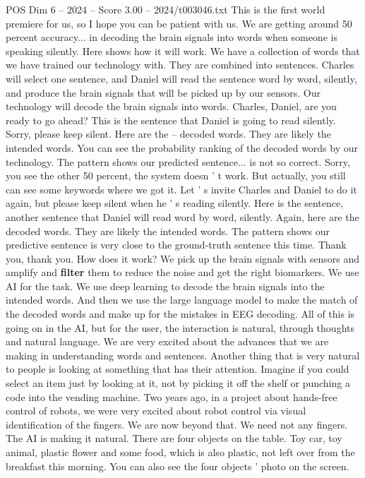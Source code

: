 \begin{textsample}{POS Dim 6 – 2024 – Score 3.00 – 2024/t003046.txt}
This is the first world premiere for us, so I hope you can be patient with us.
We are getting around 50 percent accuracy... in decoding the brain signals into words when someone is speaking silently.
Here shows how it will work.
We have a collection of words that we have trained our technology with.
They are combined into sentences.
Charles will select one sentence, and Daniel will read the sentence word by word, silently, and produce the brain signals that will be picked up by our sensors.
Our technology will decode the brain signals into words.
Charles, Daniel, are you ready to go ahead?
This is the sentence that Daniel is going to read silently.
Sorry, please keep silent.
Here are the -- decoded words.
They are likely the intended words.
You can see the probability ranking of the decoded words by our technology.
The pattern shows our predicted sentence... is not so correct.
Sorry, you see the other 50 percent, the system doesn ' t work.
But actually, you still can see some keywords where we got it.
Let ' s invite Charles and Daniel to do it again, but please keep silent when he ' s reading silently.
Here is the sentence, another sentence that Daniel will read word by word, silently.
Again, here are the decoded words.
They are likely the intended words.
The pattern shows our predictive sentence is very close to the ground-truth sentence this time.
Thank you, thank you.
How does it work?
We pick up the brain signals with sensors and amplify and \textbf{filter} them to reduce the noise and get the right biomarkers.
We use AI for the task.
We use deep learning to decode the brain signals into the intended words.
And then we use the large language model to make the match of the decoded words and make up for the mistakes in EEG decoding.
All of this is going on in the AI, but for the user, the interaction is natural, through thoughts and natural language.
We are very excited about the advances that we are making in understanding words and sentences.
Another thing that is very natural to people is looking at something that has their attention.
Imagine if you could select an item just by looking at it, not by picking it off the shelf or punching a code into the vending machine.
Two years ago, in a project about hands-free control of robots, we were very excited about robot control via visual identification of the fingers.
We are now beyond that.
We need not any fingers.
The AI is making it natural.
There are four objects on the table.
Toy car, toy animal, plastic flower and some food, which is also plastic, not left over from the breakfast this morning.
You can also see the four objects ' photo on the screen.

\end{textsample}
